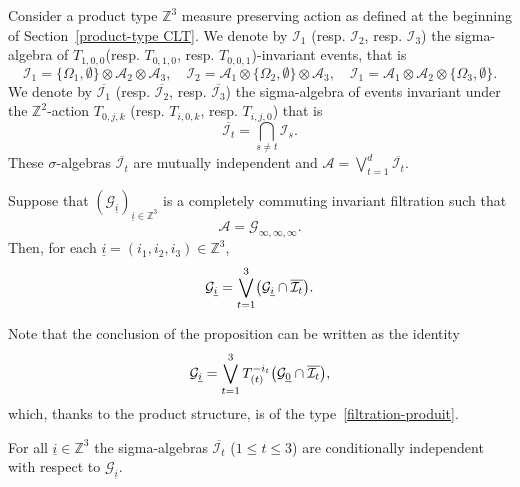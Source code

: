 \documentclass[AHL,Unicode,longabstracts,published]{cedram}
\newcommand{\Z}{\mathbb{Z}}
\newcommand*\I{\mathcal{I}}
\newcommand*\A{\mathcal{A}}
\newcommand*\G{\mathcal{G}}
\let\originalleft\left
\let\originalright\right
\renewcommand{\left}{\mathopen{}\mathclose\bgroup\originalleft}
\renewcommand{\right}{\aftergroup\egroup\originalright}
\begin{document}
Consider a product type $\Z^3$ measure preserving action as defined at the beginning of Section~\ref{product-type CLT}. We denote by $\I_1$ (resp. $\I_2$, resp. $\I_3$) the sigma-algebra of $T_{1,0,0}$(resp. $T_{0,1,0}$, resp. $T_{0,0,1}$)-invariant events, that is
\[
\I_1=\{\Omega_1,\emptyset\}\otimes\A_2\otimes\A_{3},\quad \I_2=\A_1\otimes\{\Omega_2,\emptyset\}\otimes\A_{3},\quad \I_1=\A_1\otimes\A_2\otimes\{\Omega_3,\emptyset\}.
\]
We denote by $\overline{\I_1}$ (resp. $\overline{\I_2}$, resp. $\overline{\I_3}$) the sigma-algebra of events invariant under the $\Z^{2}$-action $T_{0,j,k}$ (resp. $T_{i,0,k}$, resp. $T_{i,j,0}$) that is
\[
\overline{\I_t}=\bigcap_{s\neq t}\I_s.
\]
These $\sigma$-algebras $\overline{\I_t}$ are mutually independent and $\A=\bigvee_{t=1}^d\overline{\I_t}$.

\begin{prop}\label{filt-prod}
Suppose that $(\G_{\underline{i}})_{\underline{i}\in\Z^3}$ is a completely commuting invariant filtration such that
\[
\A=\G_{\infty,\infty,\infty}.
\]
Then, for each $\underline{i}=(i_1,i_2,i_3)\in\Z^3$,
\[
\G_{\underline{i}}=\bigvee_{t=1}^3 \left(\G_{\underline{i}}\cap\overline{\I_t}\right).
\]
\end{prop}

Note that the conclusion of the proposition can be written as the identity
\[
\G_{\underline{i}}=\bigvee_{t=1}^3 T_{(t)}^{-i_t}\left(\G_{\underline0}\cap\overline{\I_t}\right),
\]
which, thanks to the product structure, is of the type~\eqref{filtration-produit}.

\begin{lemm} \label{cond-ind}
For all $\underline{i}\in\Z^3$ the sigma-algebras $\overline{\I_t}$ ($1\leq t\leq 3$) are conditionally independent with respect to $\G_{\underline{i}}$.
\end{lemm}
\end{document}
